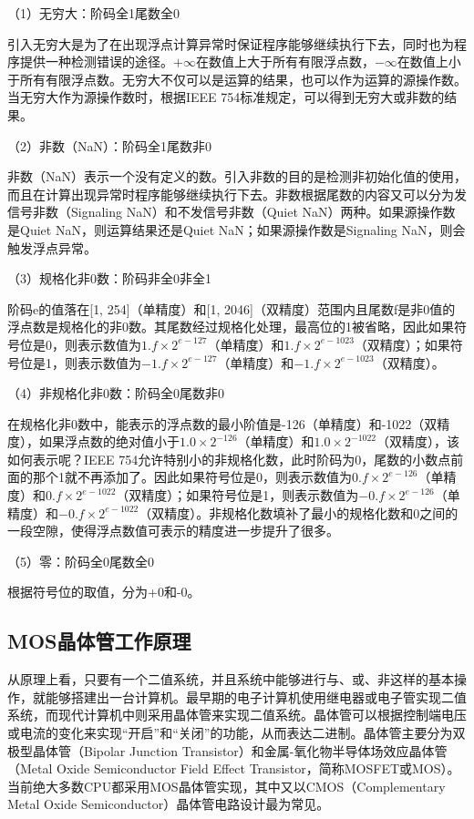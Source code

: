 \documentclass[]{ctexbook}
\begin{document}
（1）无穷大：阶码全1尾数全0

引入无穷大是为了在出现浮点计算异常时保证程序能够继续执行下去，同时也为程序提供一种检测错误的途径。\(+\infty\)在数值上大于所有有限浮点数，\(-\infty\)在数值上小于所有有限浮点数。无穷大不仅可以是运算的结果，也可以作为运算的源操作数。当无穷大作为源操作数时，根据IEEE 754标准规定，可以得到无穷大或非数的结果。

（2）非数（NaN）：阶码全1尾数非0

非数（NaN）表示一个没有定义的数。引入非数的目的是检测非初始化值的使用，而且在计算出现异常时程序能够继续执行下去。非数根据尾数的内容又可以分为发信号非数（Signaling NaN）和不发信号非数（Quiet NaN）两种。如果源操作数是Quiet NaN，则运算结果还是Quiet NaN；如果源操作数是Signaling NaN，则会触发浮点异常。

（3）规格化非0数：阶码非全0非全1

阶码e的值落在{[}1, 254{]}（单精度）和{[}1, 2046{]}（双精度）范围内且尾数f是非0值的浮点数是规格化的非0数。其尾数经过规格化处理，最高位的1被省略，因此如果符号位是0，则表示数值为\(1.f\times 2^{e-127}\)（单精度）和\(1.f\times 2^{e-1023}\)（双精度）；如果符号位是1，则表示数值为\(-1.f\times 2^{e-127}\)（单精度）和\(-1.f\times 2^{e-1023}\)（双精度）。

（4）非规格化非0数：阶码全0尾数非0

在规格化非0数中，能表示的浮点数的最小阶值是-126（单精度）和-1022（双精度），如果浮点数的绝对值小于\(1.0\times 2^{-126}\)（单精度）和\(1.0\times 2^{-1022}\)（双精度），该如何表示呢？IEEE 754允许特别小的非规格化数，此时阶码为0，尾数的小数点前面的那个1就不再添加了。因此如果符号位是0，则表示数值为\(0.f\times 2^{e-126}\)（单精度）和\(0.f\times 2^{e-1022}\)（双精度）；如果符号位是1，则表示数值为\(-0.f\times 2^{e-126}\)（单精度）和\(-0.f\times 2^{e-1022}\)（双精度）。非规格化数填补了最小的规格化数和0之间的一段空隙，使得浮点数值可表示的精度进一步提升了很多。

（5）零：阶码全0尾数全0

根据符号位的取值，分为+0和-0。

\hypertarget{sec-MOS-principle}{%
\subsection{MOS晶体管工作原理}\label{sec-MOS-principle}}

从原理上看，只要有一个二值系统，并且系统中能够进行与、或、非这样的基本操作，就能够搭建出一台计算机。最早期的电子计算机使用继电器或电子管实现二值系统，而现代计算机中则采用晶体管来实现二值系统。晶体管可以根据控制端电压或电流的变化来实现``开启''和``关闭''的功能，从而表达二进制。晶体管主要分为双极型晶体管（Bipolar Junction Transistor）和金属-氧化物半导体场效应晶体管（Metal Oxide Semiconductor Field Effect Transistor，简称MOSFET或MOS）。当前绝大多数CPU都采用MOS晶体管实现，其中又以CMOS（Complementary Metal Oxide Semiconductor）晶体管电路设计最为常见。
\end{document}
